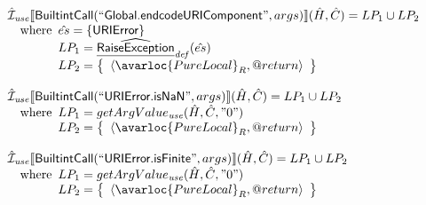 \[\begin{array}{l}
\aI_{\it use}\lbr \SF{BuiltintCall}(``\SF{Global.endcodeURIComponent}",args)\rbr(\hat{H},\hat{C})
  = LP_1 \cup LP_2\\
\quad\wherec{
  \hat{es} = \{ \SF{URIError} \}\\
  LP_1 = \ahf{RaiseException}_{\it def}(\hat{es})\\
  LP_2 = \set{\langle\avarloc{PureLocal}_R,\varprop{return}\rangle}\\
  }\\
\\

\aI_{\it use}\lbr \SF{BuiltintCall}(``\SF{URIError.isNaN}",args)\rbr(\hat{H},\hat{C})
  = LP_1 \cup LP_2\\
\quad\wherec{
  LP_1 = getArgValue_{\it use}(\hat{H}, \hat{C}, "0")\\
  LP_2 = \set{\langle\avarloc{PureLocal}_R,\varprop{return}\rangle}\\
  }\\
\\

\aI_{\it use}\lbr \SF{BuiltintCall}(``\SF{URIError.isFinite}",args)\rbr(\hat{H},\hat{C})
  = LP_1 \cup LP_2\\
\quad\wherec{
  LP_1 = getArgValue_{\it use}(\hat{H}, \hat{C}, "0")\\
  LP_2 = \set{\langle\avarloc{PureLocal}_R,\varprop{return}\rangle}\\
  }\\
\\
\end{array}
\]



